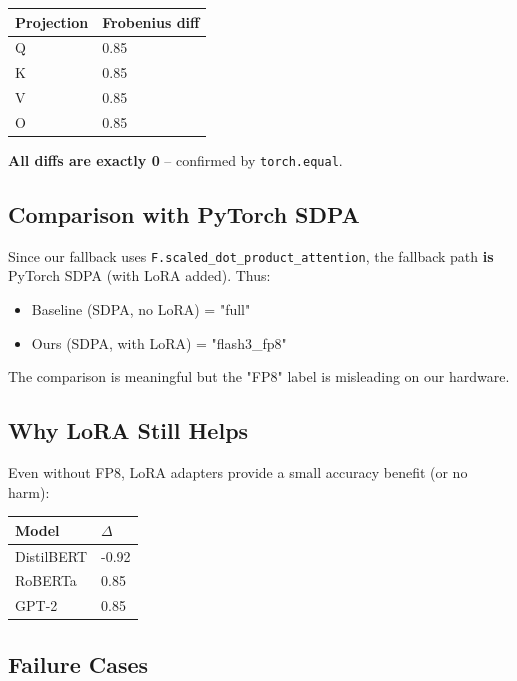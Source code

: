\begin{table}[H]
\centering
\small
\begin{tabular}{ll}
\toprule
\textbf{Projection} & \textbf{Frobenius diff} \\
\midrule
Q & 0.85 \\
K & 0.85 \\
V & 0.85 \\
O & 0.85 \\
\bottomrule
\end{tabular}
\end{table}

\textbf{All diffs are exactly 0} -- confirmed by \texttt{torch.equal}.

\subsection{Comparison with PyTorch SDPA}

Since our fallback uses \texttt{F.scaled\_dot\_product\_attention}, the fallback path 
\textbf{is} PyTorch SDPA (with LoRA added). Thus:

\begin{itemize}
\item Baseline (SDPA, no LoRA) = "full"
\item Ours (SDPA, with LoRA) = "flash3\_fp8"

\end{itemize}
The comparison is meaningful but the "FP8" label is misleading on our 
hardware.

\subsection{Why LoRA Still Helps}

Even without FP8, LoRA adapters provide a small accuracy benefit (or no 
harm):

\begin{table}[H]
\centering
\small
\begin{tabular}{ll}
\toprule
\textbf{Model} & \textbf{$\Delta$} \\
\midrule
DistilBERT & -0.92 \\
RoBERTa & 0.85 \\
GPT-2 & 0.85 \\
\bottomrule
\end{tabular}
\end{table}

\subsection{Failure Cases}

